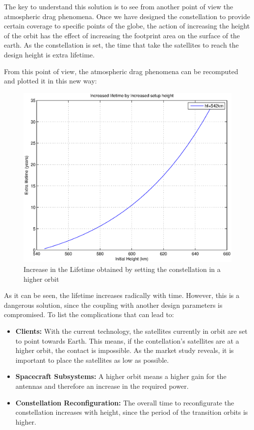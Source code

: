 The key to understand this solution is to see from another point of view the atmospheric drag phenomena. Once we have designed the constellation to provide certain coverage to specific points of the globe, the action of increasing the height of the orbit has the effect of increasing the footprint area on the surface of the earth. As the constellation is set, the time that take the satellites to reach the design height is extra lifetime. 

From this point of view, the atmospheric drag phenomena can be recomputed and plotted it in this new way:

\begin{figure}[H]
\centering
\includegraphics[scale=0.7]{ExtraLifetime/ExtraLifetime.eps}
\caption{Increase in the Lifetime obtained by setting the constellation in a higher orbit}
\end{figure}

As it can be seen, the lifetime increases radically with time. However, this is a dangerous solution, since the coupling with another design parameters is compromised. To list the complications that can lead to:

\begin{itemize}
\item \textbf{Clients: }With the current technology, the satellites currently in orbit are set to point towards Earth. This means, if the contellation's satellites are at a higher orbit, the contact is impossible. As the market study reveals, it is important to place the satellites as low as possible.
\item \textbf{Spacecraft Subsystems: }A higher orbit means a higher gain for the antennas and therefore an increase in the required power.
\item \textbf{Constellation Reconfiguration: } The overall time to reconfigurate the constellation increases with height, since the period of the transition orbits is higher.
\end{itemize}


